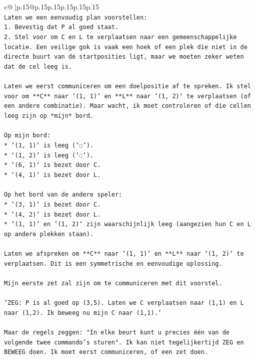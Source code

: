 \documentclass{article}
\begin{document}
{\begin{supertabular}{c@{$\;$}|p{.15\linewidth}@{}p{.15\linewidth}p{.15\linewidth}p{.15\linewidth}p{.15\linewidth}p{.15\linewidth}}
{{{\\ 
\texttt{Laten we een eenvoudig plan voorstellen:} \\
\texttt{1.  Bevestig dat P al goed staat.} \\
\texttt{2.  Stel voor om C en L te verplaatsen naar een gemeenschappelijke locatie. Een veilige gok is vaak een hoek of een plek die niet in de directe buurt van de startposities ligt, maar we moeten zeker weten dat de cel leeg is.} \\
\\ 
\texttt{Laten we eerst communiceren om een doelpositie af te spreken. Ik stel voor om **C** naar `(1, 1)` en **L** naar `(1, 2)` te verplaatsen (of een andere combinatie). Maar wacht, ik moet controleren of die cellen leeg zijn op *mijn* bord.} \\
\\ 
\texttt{Op mijn bord:} \\
\texttt{*   `(1, 1)` is leeg (`◌`).} \\
\texttt{*   `(1, 2)` is leeg (`◌`).} \\
\texttt{*   `(6, 1)` is bezet door C.} \\
\texttt{*   `(4, 1)` is bezet door L.} \\
\\ 
\texttt{Op het bord van de andere speler:} \\
\texttt{*   `(3, 1)` is bezet door C.} \\
\texttt{*   `(4, 2)` is bezet door L.} \\
\texttt{*   `(1, 1)` en `(1, 2)` zijn waarschijnlijk leeg (aangezien hun C en L op andere plekken staan).} \\
\\ 
\texttt{Laten we afspreken om **C** naar `(1, 1)` en **L** naar `(1, 2)` te verplaatsen. Dit is een symmetrische en eenvoudige oplossing.} \\
\\ 
\texttt{Mijn eerste zet zal zijn om te communiceren met dit voorstel.} \\
\\ 
\texttt{`ZEG: P is al goed op (3,5). Laten we C verplaatsen naar (1,1) en L naar (1,2). Ik beweeg nu mijn C naar (1,1).`} \\
\\ 
\texttt{Maar de regels zeggen: "In elke beurt kunt u precies één van de volgende twee commando's sturen". Ik kan niet tegelijkertijd ZEG en BEWEEG doen. Ik moet eerst communiceren, of een zet doen.} \\
\\ 
}}}
\end{supertabular}}
\end{document}
